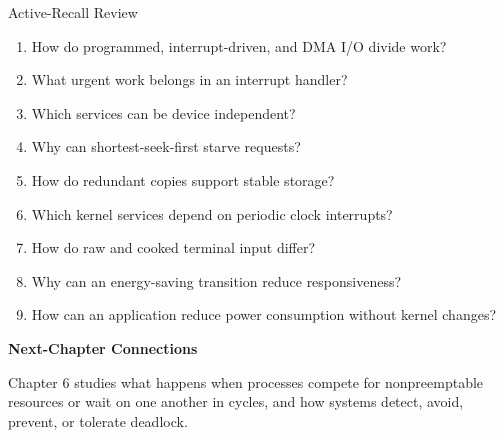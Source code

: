 \documentclass[10pt,letterpaper]{article}
\begin{document}
\enlargethispage{2\baselineskip}
\begin{studybox}{Active-Recall Review}
\small
\begin{enumerate}
  \item How do programmed, interrupt-driven, and DMA I/O divide work?
  \item What urgent work belongs in an interrupt handler?
  \item Which services can be device independent?
  \item Why can shortest-seek-first starve requests?
  \item How do redundant copies support stable storage?
  \item Which kernel services depend on periodic clock interrupts?
  \item How do raw and cooked terminal input differ?
  \item Why can an energy-saving transition reduce responsiveness?
  \item How can an application reduce power consumption without kernel changes?
\end{enumerate}
\end{studybox}

\par\medskip
{\color{navy}\bfseries Next-Chapter Connections}\par\smallskip
Chapter 6 studies what happens when processes compete for nonpreemptable resources or wait on one another in cycles, and how systems detect, avoid, prevent, or tolerate deadlock.
\normalsize
\end{document}

